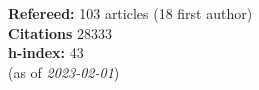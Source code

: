 \textbf{Refereed:} 103 articles (18 first author)\\\textbf{Citations} 28333\\\textbf{h-index:} 43\\(as of \textit{2023-02-01})